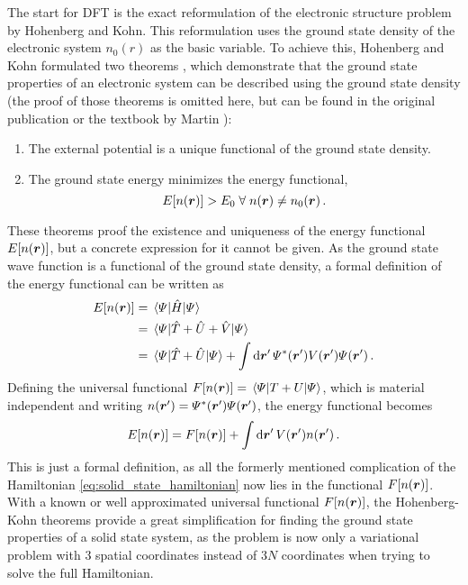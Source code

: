 \documentclass[main.tex]{subfiles}
\begin{document}
The start for DFT is the exact reformulation of the electronic structure problem by Hohenberg and Kohn.
This reformulation uses the ground state density of the electronic system \(n_0 (r)\) as the basic variable.
To achieve this, Hohenberg and Kohn formulated two theorems \cite{hohenberg_inhomogeneous_1964}, which demonstrate that the ground state properties of an electronic system can be described using the ground state density (the proof of those theorems is omitted here, but can be found in the original publication \cite{hohenberg_inhomogeneous_1964} or the textbook by Martin \cite[chapter 6.2]{martin_electronic_2004}):
\begin{enumerate}[I]
    \item The external potential is a unique functional of the ground state density.
    \item The ground state energy minimizes the energy functional,
    \[E[n(\vb*{r})] > E_0 \;\forall\; n(\vb*{r}) \neq n_0 (\vb*{r})\,.\]
\end{enumerate}
These theorems proof the existence and uniqueness of the energy functional \(E[n(\vb*{r})]\), but a concrete expression for it cannot be given.
As the ground state wave function is a functional of the ground state density, a formal definition of the energy functional can be written as
\begin{align*}
    E[n(\vb*{r})] &= \expval{\hat{H}}{\Psi} \\
    &= \expval{\hat{T} + \hat{U} + \hat{V}}{\Psi} \\
    &= \expval{\hat{T} + \hat{U}}{\Psi} + \int \dd{\vb*{r}^{\prime}} \Psi^* (\vb*{r}^{\prime}) V(\vb*{r}^{\prime}) \Psi (\vb*{r}^{\prime})\,.
\end{align*}
Defining the universal functional \(F[n(\vb*{r})] = \expval{T + U}{\Psi}\), which is material independent and writing \(n (\vb*{r}^{\prime}) = \Psi^* (\vb*{r}^{\prime}) \Psi (\vb*{r}^{\prime})\), the energy functional becomes
\begin{equation}\label{eq:hohenberg_kohn_energy_functional}
    E[n(\vb*{r})] = F[n(\vb*{r})] + \int \dd{\vb*{r}^{\prime}} V(\vb*{r}^{\prime}) n (\vb*{r}^{\prime})\,.
\end{equation}
This is just a formal definition, as all the formerly mentioned complication of the Hamiltonian \ref{eq:solid_state_hamiltonian} now lies in the functional \(F[n(\vb*{r})]\).
With a known or well approximated universal functional \(F[n(\vb*{r})]\), the Hohenberg-Kohn theorems provide a great simplification for finding the ground state properties of a solid state system, as the problem is now only a variational problem with 3 spatial coordinates instead of \(3N\) coordinates when trying to solve the full Hamiltonian.
\end{document}
